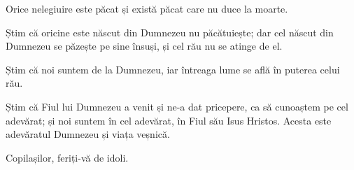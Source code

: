 {Orice nelegiuire este păcat și există păcat care nu duce la moarte.


\par }{\PP {}Știm că oricine este născut din Dumnezeu nu păcătuiește; dar cel născut din Dumnezeu se păzește pe sine însuși, și cel rău nu se atinge de el.

Știm că noi suntem de la Dumnezeu, iar întreaga lume se află în puterea celui rău.

Știm că Fiul lui Dumnezeu a venit și ne-a dat pricepere, ca să cunoaștem pe cel adevărat; și noi suntem în cel adevărat, în Fiul său Isus Hristos. Acesta este adevăratul Dumnezeu și viața veșnică.


\par }{\PP {}Copilașilor, feriți-vă de idoli.


\par }